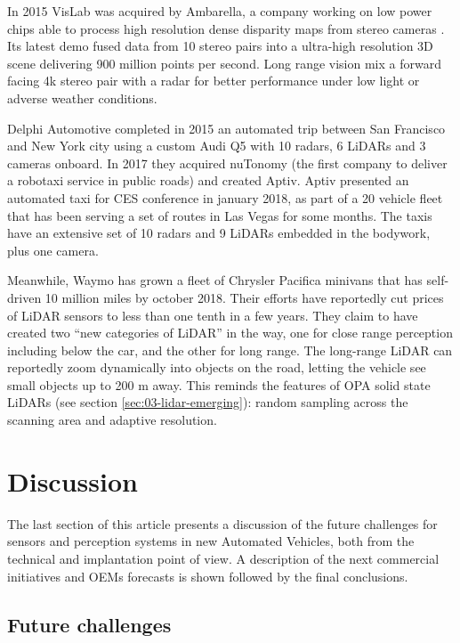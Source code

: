 \documentclass[journal]{IEEEtran}
\begin{document}
In 2015 VisLab was acquired by Ambarella, a company working on low power chips
able to process high resolution dense disparity maps from stereo cameras
\cite{Ambarella2018}. 
Its latest demo \cite{AUVSI2018} fused data from 10 stereo pairs into a
ultra-high resolution 3D scene delivering 900 million points per second.
Long range vision mix a forward facing 4k stereo pair with a radar for better
performance under low light or adverse weather conditions. 

Delphi Automotive completed in 2015 an automated trip between San Francisco and
New York city using a custom Audi Q5 with 10 radars, 6 LiDARs and 3 cameras 
onboard. In 2017 they acquired nuTonomy (the first company to deliver a 
robotaxi service in public roads) and created Aptiv. 
Aptiv presented an automated taxi for CES conference in january 2018, as part
of a 20 vehicle fleet that has been serving a set of routes in Las Vegas for
some months. The taxis have an extensive set of 10 radars and 9 LiDARs embedded 
in the bodywork, plus one camera.

Meanwhile, Waymo has grown a fleet of Chrysler Pacifica minivans that has
self-driven 10 million miles by october 2018. Their efforts have reportedly 
cut prices of LiDAR sensors to less than one tenth in a few years. 
They claim to have created two ``new categories of LiDAR'' \cite{Waymoteam2017} 
in the way, one for close range perception including below the car, and the
other for long range. The long-range LiDAR can reportedly zoom dynamically into 
objects on the road, letting the vehicle see small objects up to 200 m away. 
This reminds the features of OPA solid state LiDARs (see section
\ref{sec:03-lidar-emerging}): random sampling across the 
scanning area and adaptive resolution.


\section{Discussion}
\label{sec:06-discussion}

The last section of this article presents a discussion of the future challenges 
for sensors and perception systems in new Automated Vehicles, both from the 
technical and implantation point of view. A description of the next 
commercial initiatives and OEMs forecasts is shown followed by the final 
conclusions.

\subsection{Future challenges}
\end{document}
